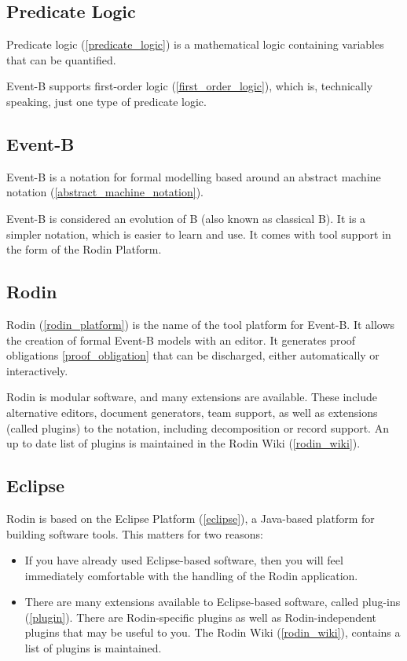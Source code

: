 \subsection{Predicate Logic}

Predicate logic (\ref{predicate_logic}) is a mathematical logic containing variables that can be quantified.

Event-B supports first-order logic (\ref{first_order_logic}), which is, technically speaking, just one type of predicate logic.  

\subsection{Event-B}

Event-B is a notation for formal modelling based around an abstract machine notation (\ref{abstract_machine_notation}).

Event-B is considered an evolution of B (also known as classical B). It is a simpler notation, which is easier to learn and use. It comes with tool support in the form of the Rodin Platform.

\subsection{Rodin}

Rodin (\ref{rodin_platform}) is the name of the tool platform for Event-B.  It allows the creation of formal Event-B models with an editor.  It generates proof obligations \ref{proof_obligation} that can be discharged, either automatically or interactively.

Rodin is modular software, and many extensions are available.  These include alternative editors, document generators, team support, as well as extensions (called plugins) to the notation, including decomposition or record support.  An up to date list of plugins is maintained in the Rodin Wiki (\ref{rodin_wiki}).

\subsection{Eclipse} \label{subsection_eclipse}

Rodin is based on the Eclipse Platform (\ref{eclipse}), a Java-based platform for building software tools.  This matters for two reasons:
\begin{itemize}
	\item If you have already used Eclipse-based software, then you will feel immediately comfortable with the handling of the Rodin application.
	\item There are many extensions available to Eclipse-based software, called plug-ins (\ref{plugin}).  There are Rodin-specific plugins as well as Rodin-independent plugins that may be useful to you.  The Rodin Wiki (\ref{rodin_wiki}), contains a list of plugins is maintained.
\end{itemize}

